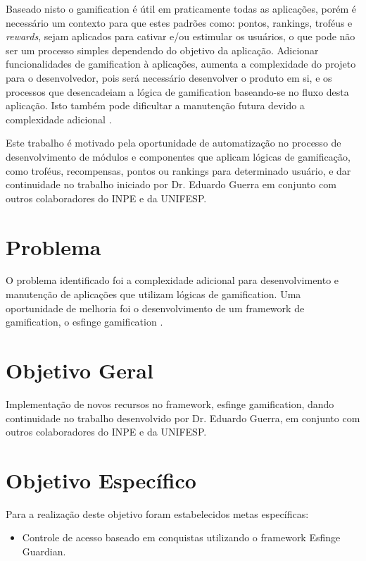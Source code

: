 \par Baseado nisto o gamification é útil em praticamente todas as aplicações, porém é necessário um contexto para que estes padrões como: pontos, rankings, troféus e \textit{rewards}, sejam aplicados para cativar e/ou estimular os usuários, o que pode não ser um processo simples dependendo do objetivo da aplicação. Adicionar funcionalidades de gamification à aplicações, aumenta a complexidade do projeto para o desenvolvedor, pois será necessário desenvolver o produto em si, e os processos que desencadeiam a lógica de gamification baseando-se no fluxo desta aplicação. Isto também pode dificultar a manutenção futura devido a complexidade adicional \cite{guerra2017approach}.

\par Este trabalho é motivado pela oportunidade de automatização no processo de desenvolvimento de módulos e componentes que aplicam lógicas de gamificação, como troféus, recompensas, pontos ou rankings para determinado usuário, e dar continuidade no trabalho iniciado por Dr. Eduardo Guerra em conjunto com outros colaboradores do INPE e da UNIFESP.

\section{Problema}

\par O problema identificado foi a complexidade adicional para desenvolvimento e manutenção de aplicações que utilizam lógicas de gamification. Uma oportunidade de melhoria foi o desenvolvimento de um framework de gamification, o esfinge gamification \cite{guerra2017approach}.

\section{Objetivo Geral}

\par Implementação de novos recursos no framework, esfinge gamification, dando continuidade no trabalho desenvolvido por Dr. Eduardo Guerra, em conjunto com outros colaboradores do INPE e da UNIFESP. 

\section{Objetivo Espec\'ifico}

\par Para a realização deste objetivo foram estabelecidos metas específicas:
\begin{itemize}
    \item Controle de acesso baseado em conquistas utilizando o framework Esfinge Guardian.
\end{itemize}

